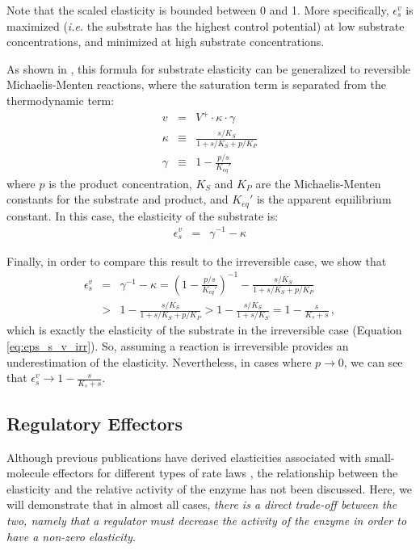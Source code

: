 \documentclass[12pt,a4paper]{article}
\begin{document}
Note that the scaled elasticity is bounded between 0 and 1. More specifically, $\epsilon_s^v$ is maximized (\textit{i.e.} the substrate has the highest control potential) at low substrate concentrations, and minimized at high substrate concentrations.

As shown in \cite{Noor2013-vv}, this formula for substrate elasticity can be generalized to reversible Michaelis-Menten reactions, where the saturation term is separated from the thermodynamic term:
\begin{eqnarray}
    v &=& V^+ \cdot \kappa \cdot \gamma \\
    \kappa &\equiv& \frac{s/K_S}{1 + s/K_S + p/K_P} \\
    \gamma &\equiv& 1 - \frac{p/s}{K_{eq}'}
\end{eqnarray}
where $p$ is the product concentration, $K_S$ and $K_P$ are the Michaelis-Menten constants for the substrate and product, and $K_{eq}'$ is the apparent equilibrium constant. In this case, the elasticity of the substrate is:
\begin{eqnarray}\label{eq:reversible_substrate_eps}
    \epsilon_s^v &=& \gamma^{-1} - \kappa
\end{eqnarray}

Finally, in order to compare this result to the irreversible case, we show that
\begin{eqnarray}\label{eq:reversible_substrate_eps}
\epsilon_{s}^v &=& \gamma^{-1} - \kappa = \left(1 - \frac{p/s}{K_{eq}'}\right)^{-1} - \frac{s/K_S}{1 + s/K_S + p/K_P} \nonumber\\
&>& 1 - \frac{s/K_S}{1 + s/K_S + p/K_P} > 1 - \frac{s/K_S}{1 + s/K_S} = 1 - \frac{s}{K_s + s}\,,
\end{eqnarray}
which is exactly the elasticity of the substrate in the irreversible case (Equation \ref{eq:eps_s_v_irr}). So, assuming a reaction is irreversible provides an underestimation of the elasticity. Nevertheless, in cases where $p \rightarrow 0$, we can see that $\epsilon_{s}^v \rightarrow 1 - \frac{s}{K_s + s}$.

\subsection{Regulatory Effectors}
Although previous publications have derived elasticities associated with small-molecule effectors for different types of rate laws \cite{Heinrich1974-yj, Liebermeister2010-vd}, the relationship between the elasticity and the relative activity of the enzyme has not been discussed. Here, we will demonstrate that in almost all cases, \emph{there is a direct trade-off between the two, namely that a regulator must decrease the activity of the enzyme in order to have a non-zero elasticity.}
\end{document}
